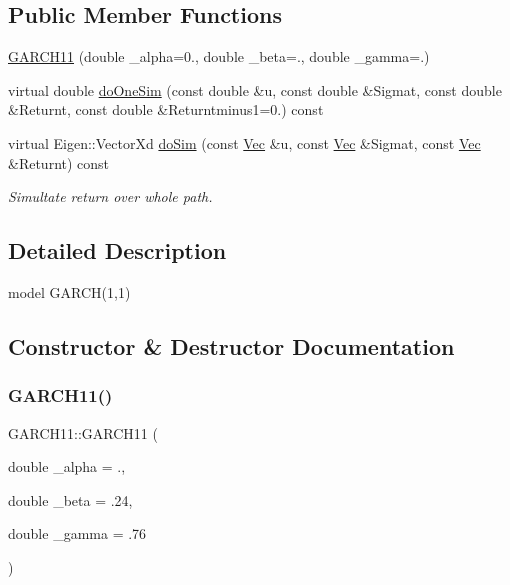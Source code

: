 \subsection*{Public Member Functions}
\begin{DoxyCompactItemize}
\item 
\hyperlink{classGARCH11_a7c6f1b56ce23150073f733a64f21bffc}{G\+A\+R\+C\+H11} (double \+\_\+alpha=0., double \+\_\+beta=., double \+\_\+gamma=.)
\item 
virtual double \hyperlink{classGARCH11_a8f6e87b2b85a91e02416d4d02bf7b9ff}{do\+One\+Sim} (const double \&u, const double \&Sigmat, const double \&Returnt, const double \&Returntminus1=0.) const
\item 
virtual Eigen\+::\+Vector\+Xd \hyperlink{classGARCH11_a202ee361532058114cfc036c27bef601}{do\+Sim} (const \hyperlink{compute__returns__eigen_8h_a1eb6a9306ef406d7975f3cbf2e247777}{Vec} \&u, const \hyperlink{compute__returns__eigen_8h_a1eb6a9306ef406d7975f3cbf2e247777}{Vec} \&Sigmat, const \hyperlink{compute__returns__eigen_8h_a1eb6a9306ef406d7975f3cbf2e247777}{Vec} \&Returnt) const
\begin{DoxyCompactList}\small\item\em Simultate return over whole path. \end{DoxyCompactList}\end{DoxyCompactItemize}


\subsection{Detailed Description}
model G\+A\+R\+C\+H(1,1) 

\subsection{Constructor \& Destructor Documentation}
\hypertarget{classGARCH11_a7c6f1b56ce23150073f733a64f21bffc}{}\label{classGARCH11_a7c6f1b56ce23150073f733a64f21bffc} 
\subsubsection{\texorpdfstring{G\+A\+R\+C\+H11()}{GARCH11()}}
{\footnotesize\ttfamily G\+A\+R\+C\+H11\+::\+G\+A\+R\+C\+H11 (\begin{DoxyParamCaption}\item[{double}]{\+\_\+alpha = {.},  }\item[{double}]{\+\_\+beta = {\ttfamily .24},  }\item[{double}]{\+\_\+gamma = {\ttfamily .76} }\end{DoxyParamCaption})}


